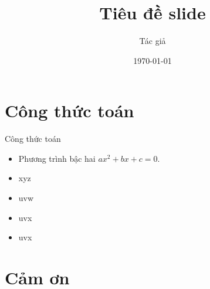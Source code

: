 \documentclass {beamer}
\begin{document}
   
\hustslide

\title{Tiêu đề slide}
\author{Tác giả}
\date{\today}
\hustmaketitle			%
\section{Công thức toán}
\begin{frame}{Công thức toán}
    \begin{itemize}
	\item Phương trình bậc hai $ax^2 + bx + c = 0$.
	\item xyz
	\item uvw
	\item uvx
	\item uvx  
    \end{itemize}
\end{frame}
\section{Cảm ơn}
\begin{thankhust}
\end{thankhust}
\end{document}

